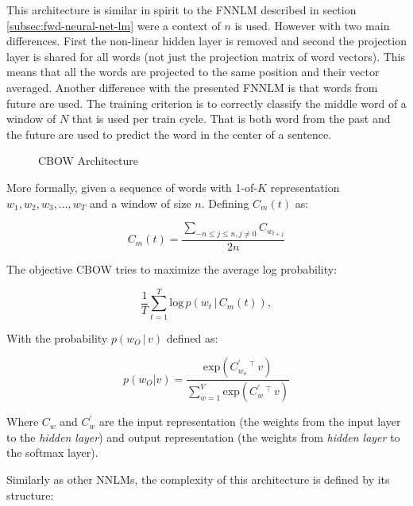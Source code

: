 This architecture is similar in spirit to the  \ac{FNNLM} described in section
\ref{subsec:fwd-neural-net-lm} were a context of $n$ is used. However with two main differences. First the
non-linear hidden layer is removed and second the projection layer is shared for
all words (not just the projection matrix of word vectors). This means that
all the words are projected to the same position and their vector averaged.
Another difference with the presented \ac{FNNLM}  is that words from future are used. 
The training criterion is to correctly classify the middle word of a window
of $N$ that is used per train cycle. That is both word from the past and the
future are used to predict the word in the center of a sentence.


\begin{figure}[h]
    \centering
    \caption{CBOW Architecture}
    \label{fig:cbow-architecture-alone}
\end{figure}

More formally, given a sequence of words with 1-of-$K$ representation $w_1,w_2,w_3, \dots, w_T$ and a window
of size $n$. Defining $C_m(t)$ as:

\begin{equation}
   C_{m}(t) =    \frac{\sum_{-n \leq j \leq n, j \neq 0} { 
       C_{w_{t+j}}} } {2n}    
\end{equation}

The  objective  \ac{CBOW}  tries to maximize the average log probability:


\begin{equation}
  \label{eq:logprob-cbow}
   \frac{1}{T} \sum^{T}_{t=1} \text{log} \, p
     \left( w_t \, |\, C_{m}(t) \right),
\end{equation}



With the probability  $p\left( w_O \, |\, v \right)$  defined as:

\begin{equation}
  \label{eq:logp-cbow}
  p(w_O|v) = \frac{\text{exp}\left(C^{'}_{w_o}\,^\top\,v \right)
  }{\sum^{V}_{w=1} \text{exp} \left( C^{'}_w \,^\top\, v \right)   }  
\end{equation}


Where $C_w$ and $C^{'}_w$ are the input representation (the weights from the input layer to the
\textit{hidden layer}) and output representation (the weights from
\textit{hidden layer} to the softmax layer).

Similarly as other \ac{NNLM}s, the complexity of this architecture
is defined by its structure:

